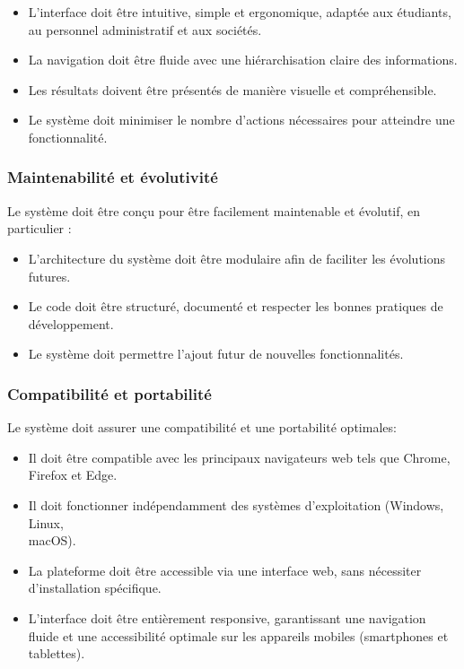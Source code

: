 \begin{itemize}
  \item L’interface doit être intuitive, simple et ergonomique, adaptée aux étudiants, au personnel
administratif et aux sociétés.
  \item La navigation doit être fluide avec une hiérarchisation claire des informations.
  \item Les résultats doivent être présentés de manière visuelle et compréhensible.
  \item Le système doit minimiser le nombre d'actions nécessaires pour atteindre une fonctionnalité.
\end{itemize}

\subsubsection{Maintenabilité et évolutivité}
Le système doit être conçu pour être facilement maintenable et évolutif, en particulier :

\begin{itemize}
  \item L'architecture du système doit être modulaire afin de faciliter les évolutions futures.
  \item Le code doit être structuré, documenté et respecter les bonnes pratiques de développement.
  \item Le système doit permettre l'ajout futur de nouvelles fonctionnalités.
\end{itemize}

\subsubsection{Compatibilité et portabilité}
Le système doit assurer une compatibilité et une portabilité optimales: 

\begin{itemize}
  \item Il doit être compatible avec les principaux navigateurs web tels que Chrome, Firefox et Edge.
  \item Il doit fonctionner indépendamment des systèmes d'exploitation (Windows, Linux,
  \\macOS).
  \item La plateforme doit être accessible via une interface web, sans nécessiter d'installation spécifique.
  \item L'interface doit être entièrement responsive, garantissant une navigation fluide et une accessibilité optimale sur les appareils mobiles (smartphones et tablettes). 
\end{itemize}

